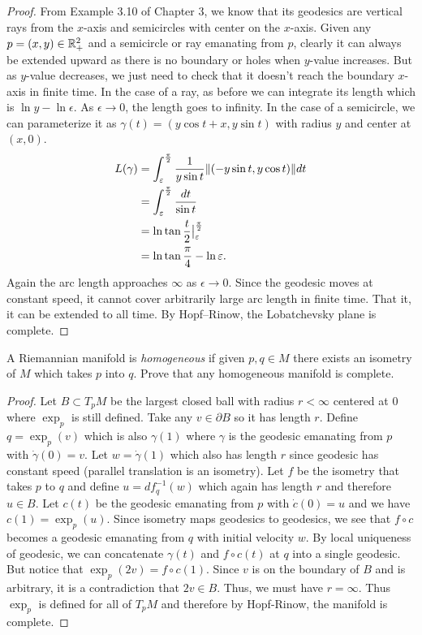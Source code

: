 \documentclass[12pt]{article}
\begin{document}
\begin{proof}
From Example 3.10 of Chapter 3, we know that its geodesics are vertical rays from the $ x$-axis and semicircles with center on the $ x$-axis. Given any $ p = (x,y) \in \mathbb{R}_+^2$ and a semicircle or ray emanating from $ p$, clearly it can always be extended upward as there is no boundary or holes when  $ y$-value increases. But as  $ y$-value decreases, we just need to check that it doesn't reach the boundary $ x$-axis in finite time. In the case of a ray, as before we can integrate its length which is $ \ln y -\ln \epsilon$. As $ \epsilon \to 0$, the length goes to infinity. In the case of a semicircle, we can parameterize it as $ \gamma(t) = (y\cos t + x, y\sin t)$ with radius $ y$ and center at $ (x,0)$. 
\begin{align*}
	L( \gamma) &= \int_{ \varepsilon}^{ \frac{\pi}{2}} \frac{1}{y \sin t}  {\left\lVert{ (-y \sin t, y \cos t)}\right\rVert} dt\\  
	&= \int_{ \varepsilon}^{ \frac{\pi}{2}} \frac{dt}{\sin t}  \\
	&= \ln \tan \frac{t}{2} \big|_{ \varepsilon}^{\frac{\pi}{2}} \\
	&= \ln \tan \frac{\pi}{4} - \ln \varepsilon .
\end{align*}
Again the arc length approaches $ \infty$ as $ \epsilon \to 0$. Since the geodesic moves at constant speed, it cannot cover arbitrarily large arc length in finite time. That it, it can be extended to all time. By Hopf--Rinow, the Lobatchevsky plane is complete.
\end{proof}
\begin{problem}[7.12]
A Riemannian manifold is \emph{homogeneous} if given $ p,q \in M$ there exists an isometry of $ M$ which takes  $ p$ into  $ q$. Prove that any homogeneous manifold is complete. 
\end{problem}
\begin{proof}
Let $ B \subset T_pM$ be the largest closed ball with radius $ r< \infty$ centered at 0 where $ \exp_p$ is still defined. Take any $ v \in \partial B$ so it has length $ r$. Define  $ q= \exp_p( v)$ which is also $ \gamma(1)$ where $ \gamma$ is the geodesic emanating from $ p$ with  $ \dot{ \gamma} (0) = v$. Let $ w = \dot{ \gamma}(1)$ which also has length $ r$ since geodesic has constant speed (parallel translation is an isometry). Let  $ f$ be the isometry that takes  $ p$ to  $ q$ and define  $ u = df^{-1}_q(w)$ which again has length  $ r$ and therefore  $ u \in B$. Let $ c(t)$ be the geodesic emanating from  $ p$ with  $ \dot{c}(0) = u$ and we have $ c(1) = \exp_p( u)$. Since isometry maps geodesics to geodesics, we see that $ f \circ c$ becomes a geodesic emanating from  $ q$ with initial velocity $ w$. By local uniqueness of geodesic, we can concatenate $ \gamma(t)$ and $ f \circ c(t)$ at $ q$ into a single geodesic. But notice that $ \exp_p( 2v) = f \circ c(1) $. Since $ v$ is  on the boundary of $ B$ and is arbitrary, it is a contradiction that $ 2v \in B$. Thus, we must have $ r = \infty $. Thus $ \exp_p$ is defined for all of $ T_pM$ and therefore by Hopf-Rinow, the manifold is complete.
\end{proof}
\end{document}
